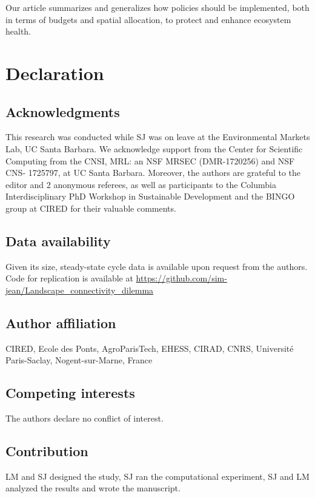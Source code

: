 Our article summarizes and generalizes how policies should be implemented, both in terms of budgets and spatial allocation, to protect and enhance ecosystem health.

\section{Declaration}
\subsection*{Acknowledgments}
This research was conducted while SJ was on leave at the Environmental Markets Lab, UC Santa Barbara. We acknowledge support from the Center for Scientific Computing from the CNSI, MRL: an NSF MRSEC (DMR-1720256) and NSF CNS- 1725797, at UC Santa Barbara. Moreover, the authors are grateful to the editor and 2 anonymous referees, as well as participants to the Columbia Interdisciplinary PhD Workshop in Sustainable Development and the BINGO group at CIRED for their valuable comments. 

\subsection*{Data availability}
Given its size, steady-state cycle data is available upon request from the authors. Code for replication is available at \url{https://github.com/sim-jean/Landscape_connectivity_dilemma}

\subsection*{Author affiliation}
CIRED, Ecole des Ponts, AgroParisTech, EHESS, CIRAD, CNRS, Université Paris-Saclay, Nogent-sur-Marne, France
\subsection*{Competing interests}
The authors declare no conflict of interest.

\subsection*{Contribution}
LM and SJ designed the study, SJ ran the computational experiment, SJ and LM analyzed the results and wrote the manuscript.

\newpage

\renewcommand{\thesection}{\Alph{section}}
\setcounter{section}{0}
\renewcommand{\thesubsection}{\Alph{subsection}}


